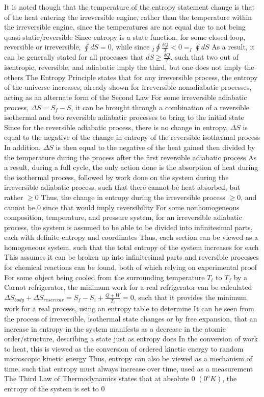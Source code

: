 \documentclass[11 pt, twoside]{article}
\newenvironment{outline*}
{
	\begin{outline}[enumerate]
	}
	{\end{outline}
}
\begin{document}
\begin{outline*}
\3 It is noted though that the temperature of the entropy statement change is that of the heat entering the irreversible engine, rather than the temperature within the irreversible engine, since the temperatures are not equal due to not being quasi-static/reversible
\1 Since entropy is a state function, for some closed loop, reversible or irreversible, $\oint dS = 0$, while since $_I\oint \frac{\delta Q}{T} < 0 = _I\oint dS$
\2 As a result, it can be generally stated for all processes that $dS \geq \frac{\delta Q}{T}$, such that two out of isentropic, reversible, and adiabatic imply the third, but one does not imply the others
\1 
\1 The Entropy Principle states that for any irreversible process, the entropy of the universe increases, already shown for irreversible nonadiabatic processes, acting as an alternate form of the Second Law
\2 For some irreversible adiabatic process, $\Delta S = S_f - S$, it can be brought through a combination of a reversible isothermal and two reversible adiabatic processes to bring to the initial state
\3 Since for the reversible adiabatic process, there is no change in entropy, $\Delta S$ is equal to the negative of the change in entropy of the reversible isothermal process
\3 In addition, $\Delta S$ is then equal to the negative of the heat gained then divided by the temperature during the process after the first reversible adiabatic process
\3 As a result, during a full cycle, the only action done is the absorption of heat during the isothermal process, followed by work done on the system during the irreversible adiabatic process, such that there cannot be heat absorbed, but rather $\geq 0$
\3 Thus, the change in entropy during the irreversible process $\geq 0$, and cannot be 0 since that would imply reversibility
\2 For some nonhomogeneous composition, temperature, and pressure system, for an irreversible adiabatic process, the system is assumed to be able to be divided into infinitesimal parts, each with definite entropy and coordinates
\3 Thus, each section can be viewed as a homogeneous system, such that the total entropy of the system increases for each
\3 This assumes it can be broken up into infinitesimal parts and reversible processes for chemical reactions can be found, both of which relying on experimental proof
\2 For some object being cooled from the surrounding temperature $T_i$ to $T_f$ by a Carnot refrigerator, the minimum work for a real refrigerator can be calculated
\3 $\Delta S_{body} + \Delta S_{reservoir} = S_f - S_i + \frac{Q + W}{T_i} = 0$, such that it provides the minimum work for a real process, using an entropy table to determine
\1 It can be seen from the process of irreversible, isothermal state changes or by free expansion, that an increase in entropy in the system manifests as a decrease in the atomic order/structure, describing a state just as entropy does
\2 In the conversion of work to heat, this is viewed as the conversion of ordered kinetic energy to random microscopic kinetic energy
\2 Thus, entropy can also be viewed as a mechanism of time, such that entropy must always increase over time, used as a measurement
\1 The Third Law of Thermodynamics states that at absolute 0 $(0^o K)$, the entropy of the system is set to 0
\end{outline*}
\end{document}
